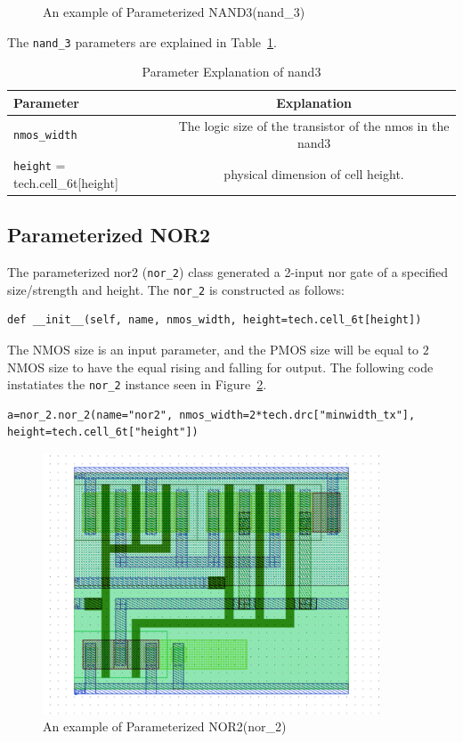\begin{figure}[h!]
\centering
\caption{An example of Parameterized NAND3(nand\_3)}
\label{fig:nand3}
\end{figure}

The \verb|nand_3| parameters are explained in Table~\ref{table:nand3_params}.
\begin{table}[h!] 
  \begin{center}
    \begin{tabular}{| l | c |}
    \hline
    Parameter & Explanation \\ \hline
    \verb|nmos_width| & The logic size of the transistor of the nmos in the nand3 \\ \hline
    \verb|height| = tech.cell\_6t[height] & physical dimension of cell height. \\ 
    \hline
    \end{tabular}
  \end{center}
  \caption{Parameter Explanation of nand3}
  \label{table:nand3_params}
\end{table}


\subsection{Parameterized NOR2}
\label{sec:nor2}

The parameterized nor2 (\verb|nor_2|) class generated a 2-input nor gate
of a specified size/strength and height.  The \verb|nor_2| is
constructed as follows:
\begin{verbatim}
def __init__(self, name, nmos_width, height=tech.cell_6t[height])
\end{verbatim}
The NMOS size is an input parameter, and the PMOS size
will be equal to $2$ NMOS size to have the equal rising and falling for output.
The following code instatiates the \verb|nor_2| instance seen in Figure~\ref{fig:nor2}.
\begin{verbatim}
a=nor_2.nor_2(name="nor2", nmos_width=2*tech.drc["minwidth_tx"], 
height=tech.cell_6t["height"])
\end{verbatim}


\begin{figure}[h!]
\centering
\includegraphics[width=10cm]{./figs/nor2.pdf}
\caption{An example of Parameterized NOR2(nor\_2)}
\label{fig:nor2}
\end{figure}

